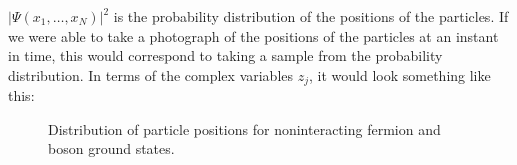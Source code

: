 \documentclass[
  letterpaper,
  DIV=11,
  numbers=noendperiod]{scrreprt}
\begin{document}
\(\vert\Psi(x_1,\ldots,x_N)\rvert^2\) is the probability distribution of
the positions of the particles. If we were able to take a photograph of
the positions of the particles at an instant in time, this would
correspond to taking a sample from the probability distribution. In
terms of the complex variables \(z_j\), it would look something like
this:

\begin{figure}

\begin{minipage}{0.50\linewidth}



\end{minipage}%
%
\begin{minipage}{0.50\linewidth}



\end{minipage}%

\caption{\label{fig-1d-dist}Distribution of particle positions for
noninteracting fermion and boson ground states.}

\end{figure}%
\end{document}
